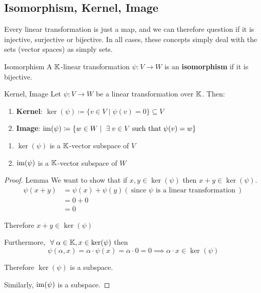 \subsection{Isomorphism, Kernel, Image}
Every linear transformation is just a map, and we can therefore question if it is injective, surjective or bijective. In all cases, these concepts simply deal with the sets (vector spaces) as simply sets.

\begin{definition} {Isomorphism}
    A \(\mathbb{K}\)-linear transformation \(\psi: V \to W\) is an \textbf{isomorphism} if it is bijective.
\end{definition}

\begin{definition} {Kernel, Image}
    Let \(\psi: V \to W\) be a linear transformation over \(\mathbb{K}\). Then: \begin{enumerate}
        \item \textbf{Kernel}: \(\ker(\psi) \coloneqq \{v \in V \mid \psi(v) = 0\} \subseteq V\)
        \item \textbf{Image}: \(\im(\psi) \coloneqq \{w \in W \mid \exists v \in V \st \psi(v) = w\}\)
    \end{enumerate}
\end{definition}

\begin{lemma}
    \hfill
    \begin{enumerate}
        \item \(\ker(\psi)\) is a \(\mathbb{K}\)-vector subspace of \(V\)
        \item \(\mathrm{im}(\psi)\) is a \(\mathbb{K}\)-vector subspace of \(W\)
    \end{enumerate}
\end{lemma}

\begin{proof} {Lemma}    
    We want to show that if \(x, y \in \ker(\psi)\) then \(x + y \in \ker(\psi)\).
    \[
        \begin{split}  
            \psi(x + y) &= \psi(x) + \psi(y) (\:\text{since \(\psi\) is a linear transformation}\: ) \\
            & = 0 + 0 \\
            &= 0
        \end{split}
    \]

    Therefore \(x + y \in \ker(\psi)\)

    Furthermore, \(\forall \alpha \in \bbk, x \in \ker(\psi)\) then \[
    \psi(\alpha, x) = \alpha \cdot \psi(x) = \alpha \cdot 0 = 0 \implies \alpha \cdot x \in \ker(\psi)
    \]

    Therefore \(\ker(\psi)\) is a subspace.

    Similarly, \(\mathrm{im}(\psi)\) is a subspace.
\end{proof}

